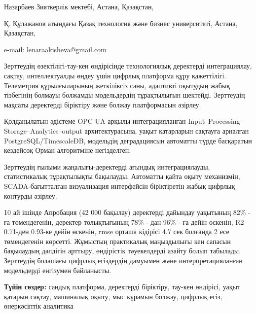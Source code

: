 \begin{affil}
Назарбаев Зияткерлік мектебі, Астана, Қазақстан,

Қ. Құлажанов атындағы Қазақ технология және бизнес университеті, Астана, Қазақстан,

e-mail: lenaraakisheva@gmail.com
\end{affil}

Зерттеудің өзектілігі-тау-кен өндірісінде технологиялық деректерді
интеграциялау, сақтау, интеллектуалды өңдеу үшін цифрлық платформа құру
қажеттілігі. Телеметрия құрылғыларының жеткіліксіз саны, адаптивті
оқытудың жабық тізбегінің болмауы болжамды модельдердің тұрақтылығын
шектейді. Зерттеудің мақсаты деректерді біріктіру және болжау
платформасын әзірлеу.

Қолданылатын әдістеме OPC UA арқылы интеграцияланған
Input--Processing--Storage--Analytics--output архитектурасына, уақыт
қатарларын сақтауға арналған PostgreSQL/TimescaleDB, модельдің
деградациясын автоматты түрде басқаратын кездейсоқ Орман алгоритміне
негізделген.

Зерттеудің ғылыми жаңалығы-деректерді ағындық интеграциялауды,
статистикалық тұрақтылықты бақылауды, Автоматты қайта оқыту механизмін,
SCADA-бағытталған визуализация интерфейсін біріктіретін жабық цифрлық
контурды әзірлеу.

10 ай ішінде Апробация (42 000 бақылау) деректерді дайындау уақытының
82\% - ға төмендегенін, деректер толықтығының 78\% - дан 96\% - ға дейін
өскенін, R2 0.71-ден 0.93-ке дейін өскенін, rmse орташа кідірісі 4.7 сек
болғанда 2 есе төмендегенін көрсетті. Жұмыстың практикалық маңыздылығы
кен сапасын бақылаудың дәлдігін арттыру, өндірістік тәуекелдерді азайту
болып табылады. Зерттеудің болашағы цифрлық егіздердің дамуымен және
интерпретацияланған модельдерді енгізумен байланысты.

{\bfseries Түйін сөздер:} сандық платформа, деректерді біріктіру, тау-кен өндірісі,
уақыт қатарын сақтау, машиналық оқыту, мыс құрамын болжау, цифрлық егіз,
өнеркәсіптік аналитика

